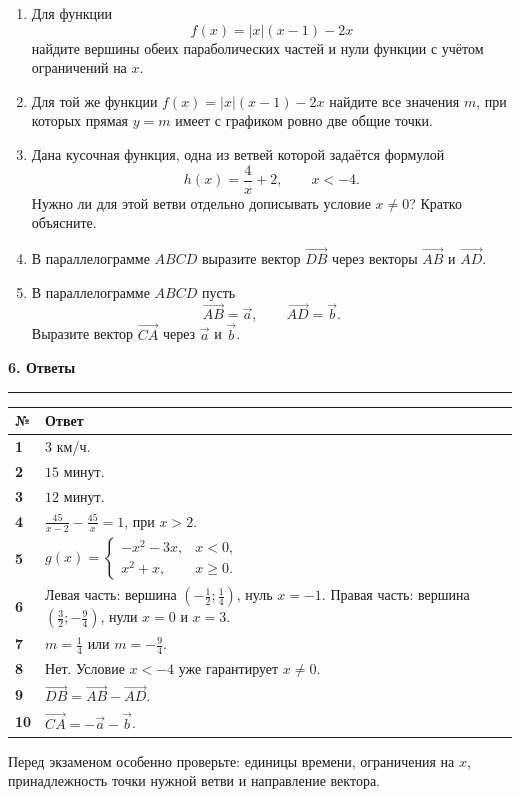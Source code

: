 \documentclass[a4paper,12pt]{article}
\newcommand{\sectiontitle}[1]{%
  \vspace{2mm}%
  {\Large\bfseries\color{darkaccent}#1}\par\vspace{2mm}%
  {\color{accent!55}\rule{\linewidth}{0.6pt}}\par\vspace{2mm}%
}
\newcommand{\vect}[2]{\overrightarrow{#1#2}}
\begin{document}
\begin{enumerate}[label=\textbf{\arabic*.},start=6]
  \item Для функции
  \[
  f(x)=|x|(x-1)-2x
  \]
  найдите вершины обеих параболических частей и нули функции с учётом ограничений на $x$.

  \item Для той же функции $f(x)=|x|(x-1)-2x$ найдите все значения $m$, при которых прямая $y=m$ имеет с графиком ровно две общие точки.

  \item Дана кусочная функция, одна из ветвей которой задаётся формулой
  \[
  h(x)=\frac{4}{x}+2,\qquad x<-4.
  \]
  Нужно ли для этой ветви отдельно дописывать условие $x\ne0$? Кратко объясните.

  \item В параллелограмме $ABCD$ выразите вектор $\vect{D}{B}$ через векторы $\vect{A}{B}$ и $\vect{A}{D}$.

  \item В параллелограмме $ABCD$ пусть
  \[
  \vect{A}{B}=\vec a,\qquad \vect{A}{D}=\vec b.
  \]
  Выразите вектор $\vect{C}{A}$ через $\vec a$ и $\vec b$.
\end{enumerate}

\clearpage

\sectiontitle{6. Ответы}

\begin{tabularx}{\linewidth}{@{}>{\bfseries}p{9mm}X@{}}
\toprule
№ & Ответ \\
\midrule
1 & $3$ км/ч. \\
2 & $15$ минут. \\
3 & $12$ минут. \\
4 & $\displaystyle \frac{45}{x-2}-\frac{45}{x}=1$, при $x>2$. \\
5 & $\displaystyle g(x)=\begin{cases}-x^2-3x,&x<0,\\x^2+x,&x\ge0.\end{cases}$ \\
6 & Левая часть: вершина $\left(-\frac12;\frac14\right)$, нуль $x=-1$. Правая часть: вершина $\left(\frac32;-\frac94\right)$, нули $x=0$ и $x=3$. \\
7 & $\displaystyle m=\frac14$ или $\displaystyle m=-\frac94$. \\
8 & Нет. Условие $x<-4$ уже гарантирует $x\ne0$. \\
9 & $\vect{D}{B}=\vect{A}{B}-\vect{A}{D}$. \\
10 & $\vect{C}{A}=-\vec a-\vec b$. \\
\bottomrule
\end{tabularx}

\vfill
{\small\color{softgray}Перед экзаменом особенно проверьте: единицы времени, ограничения на $x$, принадлежность точки нужной ветви и направление вектора.}
\end{document}
